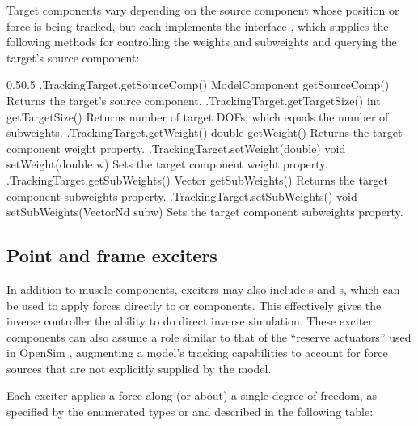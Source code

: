 Target components vary depending on the source component whose position or
force is being tracked, but each implements the interface
, which supplies
the following methods for controlling the weights and subweights and querying
the target's source component:
%
\begin{methodtable}{0.5}{0.5}
\midline
%
\methodentry
{\inverse.TrackingTarget.getSourceComp()}%
{ModelComponent getSourceComp()}%
{Returns the target's source component.}%
%
\methodentry
{\inverse.TrackingTarget.getTargetSize()}%
{int getTargetSize()}%
{Returns number of target DOFs, which equals the number of
subweights.}%
%
\methodspace{0.5em}
%
\methodentry
{\inverse.TrackingTarget.getWeight()}%
{double getWeight()}%
{Returns the target component {\sf weight} property.}%
%
\methodentry
{\inverse.TrackingTarget.setWeight(double)}%
{void setWeight(double w)}%
{Sets the target component {\sf weight} property.}%
%
\methodentry
{\inverse.TrackingTarget.getSubWeights()}%
{Vector getSubWeights()}%
{Returns the target component {\sf subweights} property.}%
%
\methodentry
{\inverse.TrackingTarget.setSubWeights()}%
{void setSubWeights(VectorNd subw)}%
{Sets the target component {\sf subweights} property.}%
%
\midline
\end{methodtable}
%

\subsection{Point and frame exciters}

In addition to muscle components, exciters may also include
s and
s, which can be used
to apply forces directly to
 or
 components. This effectively gives the inverse
controller the ability to do direct inverse simulation. These exciter
components can also assume a role similar to that of the ``reserve actuators''
used in OpenSim \cite{delp2007opensim}, augmenting a model's tracking
capabilities to account for force sources that are not explicitly supplied by
the model.

Each exciter applies a force along (or about) a single degree-of-freedom, as
specified by the enumerated types
 or
 and described
in the following table:

